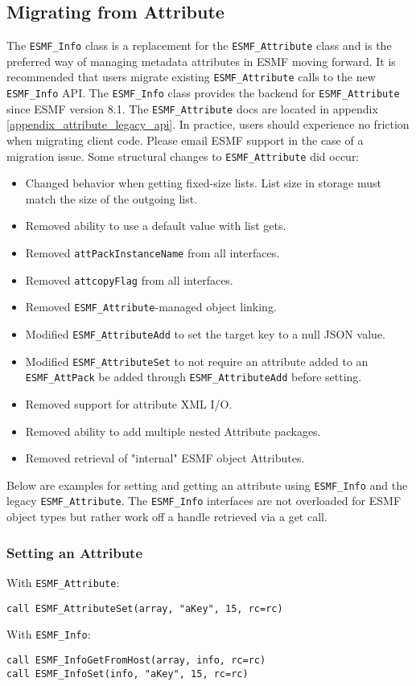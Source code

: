 \subsection{Migrating from Attribute}
The \texttt{ESMF\_Info} class is a replacement for the \texttt{ESMF\_Attribute} class and is the preferred way of managing metadata attributes in ESMF moving forward. It is recommended that users migrate existing \texttt{ESMF\_Attribute} calls to the new \texttt{ESMF\_Info} API. The \texttt{ESMF\_Info} class provides the backend for \texttt{ESMF\_Attribute} since ESMF version 8.1. The \texttt{ESMF\_Attribute} docs are located in appendix \ref{appendix_attribute_legacy_api}. In practice, users should experience no friction when migrating client code. Please email ESMF support in the case of a migration issue. Some structural changes to \texttt{ESMF\_Attribute} did occur:
\begin{itemize}
    \item Changed behavior when getting fixed-size lists. List size in storage must match the size of the outgoing list.
    \item Removed ability to use a default value with list gets.
    \item Removed \texttt{attPackInstanceName} from all interfaces.
    \item Removed \texttt{attcopyFlag} from all interfaces.
    \item Removed \texttt{ESMF\_Attribute}-managed object linking.
    \item Modified \texttt{ESMF\_AttributeAdd} to set the target key to a null JSON value.
    \item Modified \texttt{ESMF\_AttributeSet} to not require an attribute added to an \texttt{ESMF\_AttPack} be added through \texttt{ESMF\_AttributeAdd} before setting.
    \item Removed support for attribute XML I/O.
    \item Removed ability to add multiple nested Attribute packages.
    \item Removed retrieval of "internal" ESMF object Attributes.
\end{itemize}

Below are examples for setting and getting an attribute using \texttt{ESMF\_Info} and the legacy \texttt{ESMF\_Attribute}. The \texttt{ESMF\_Info} interfaces are not overloaded for ESMF object types but rather work off a handle retrieved via a get call.

\subsubsection{Setting an Attribute}
With \texttt{ESMF\_Attribute}:
\begin{verbatim}
call ESMF_AttributeSet(array, "aKey", 15, rc=rc)
\end{verbatim}
With \texttt{ESMF\_Info}:
\begin{verbatim}
call ESMF_InfoGetFromHost(array, info, rc=rc)
call ESMF_InfoSet(info, "aKey", 15, rc=rc)
\end{verbatim}

